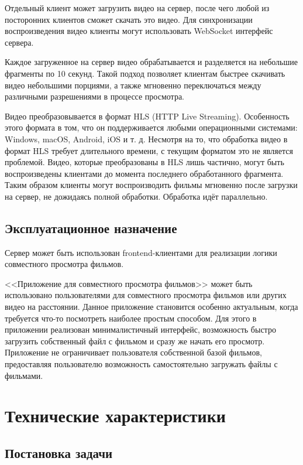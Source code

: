 \documentclass{../includes/TechDoc}
\begin{document}
    Отдельный клиент может загрузить видео на сервер, после чего любой из посторонних клиентов сможет скачать это видео.
    Для синхронизации воспроизведения видео клиенты могут использовать WebSocket интерфейс сервера.

    Каждое загруженное на сервер видео обрабатывается и разделяется на небольшие фрагменты по 10 секунд.
    Такой подход позволяет клиентам быстрее скачивать видео небольшими порциями, а также мгновенно переключаться между различными разрешениями в процессе просмотра.

    Видео преобразовывается в формат HLS (HTTP Live Streaming).
    Особенность этого формата в том, что он поддерживается любыми операционными системами: Windows, macOS, Android, iOS и т. д.
    Несмотря на то, что обработка видео в формат HLS требует длительного времени, с текущим форматом это не является проблемой.
    Видео, которые преобразованы в HLS лишь частично, могут быть воспроизведены клиентами до момента последнего обработанного фрагмента.
    Таким образом клиенты могут воспроизводить фильмы мгновенно после загрузки на сервер, не дожидаясь полной обработки.
    Обработка идёт параллельно.

    \subsection{Эксплуатационное назначение}

    Сервер может быть использован frontend-клиентами для реализации логики совместного просмотра фильмов.

    <<Приложение для совместного просмотра фильмов>> может быть использовано пользователями для совместного просмотра фильмов или других видео на расстоянии.
    Данное приложение становится особенно актуальным, когда требуется что-то посмотреть наиболее простым способом.
    Для этого в приложении реализован минималистичный интерфейс, возможность быстро загрузить собственный файл с фильмом и сразу же начать его просмотр.
    Приложение не ограничивает пользователя собственной базой фильмов, предоставляя пользователю возможность самостоятельно загружать файлы с фильмами.


    \section{Технические характеристики}

    \subsection{Постановка задачи}
\end{document}
